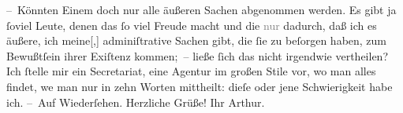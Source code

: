 \pstart
           – Könnten Einem doch nur alle äußeren Sachen abgenommen werden. Es gibt ja ſoviel
               Leute, denen das ſo viel Freude macht und die \textcolor{gray}{nur} dadurch, daß ich
               es äußere, ich {\pb}meine{[},{]} adminiſtrative
               Sachen gibt, die ſie zu beſorgen haben, zum Bewußtſein ihrer Exiſtenz kommen; – ließe
               ſich das nicht irgendwie vertheilen? Ich ſtelle mir ein Secretariat, eine Agentur im
               großen Stile vor, wo man alles findet, we{\geminationn} man nur in
               zehn Worten mittheilt: dieſe oder jene Schwierigkeit habe ich.\pend
           \pstart – Auf Wiederſehen. Herzliche Grüße! Ihr \spacefill\mbox{Arthur.}\pend{}\endnumbering{}  
      
